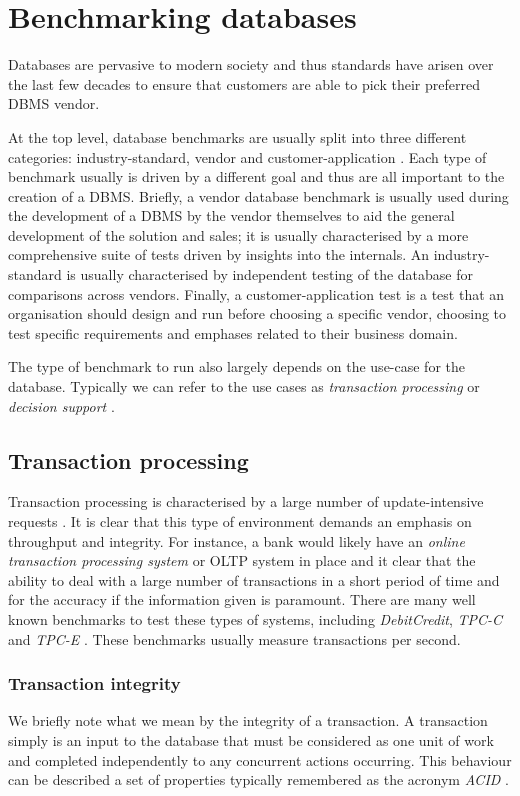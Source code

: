 \section{Benchmarking databases}
Databases are pervasive to modern society and thus standards have arisen over
the last few decades to ensure that customers are able to pick their preferred
DBMS vendor.

At the top level, database benchmarks are usually split into three different
categories: industry-standard, vendor and
customer-application \cite{PractitionersIntroduction}. Each type of benchmark
usually is driven by a different goal and thus are all important to the creation
of a DBMS. Briefly, a vendor database benchmark is usually used during the
development of a DBMS by the vendor themselves to aid
the general development of the solution and sales; it is usually characterised
by a more comprehensive suite of tests driven by insights into the internals. An
industry-standard is usually characterised by independent testing of the
database for comparisons across vendors. Finally, a customer-application test is
a test that an organisation should design and run before choosing a specific
vendor, choosing to test specific requirements and emphases related to their
business domain.


The type of benchmark to run also largely depends on the use-case for the
database. Typically we can refer to the use cases as \emph{transaction
processing} or \emph{decision support} \cite{PractitionersIntroduction}.

\subsection{Transaction processing}
Transaction processing is characterised by a large number of
update-intensive requests
\cite{PractitionersIntroduction}. It is clear that this type of environment
demands an emphasis on throughput and integrity. For instance, a bank would
likely have an \emph{online transaction processing system} or OLTP system in
place and it clear that the ability to deal with a large number of transactions
in a short period of time and for the accuracy if the information given is
paramount. There are many well known benchmarks to test these types of systems,
including \emph{DebitCredit}, \emph{TPC-C} and \emph{TPC-E} \cite{TPC-OLTP}.
These benchmarks usually measure transactions per second.

\subsubsection{Transaction integrity}
We briefly note what we mean by the integrity of a transaction. A transaction
simply is an input to the database that must be considered as one unit of work
\cite{ComputerScienceDictionary} and completed independently to any concurrent
actions occurring. This behaviour can be described a set of
properties typically remembered as the acronym \emph{ACID}
\cite{ComputerScienceDictionary, PractitionersIntroduction}.
